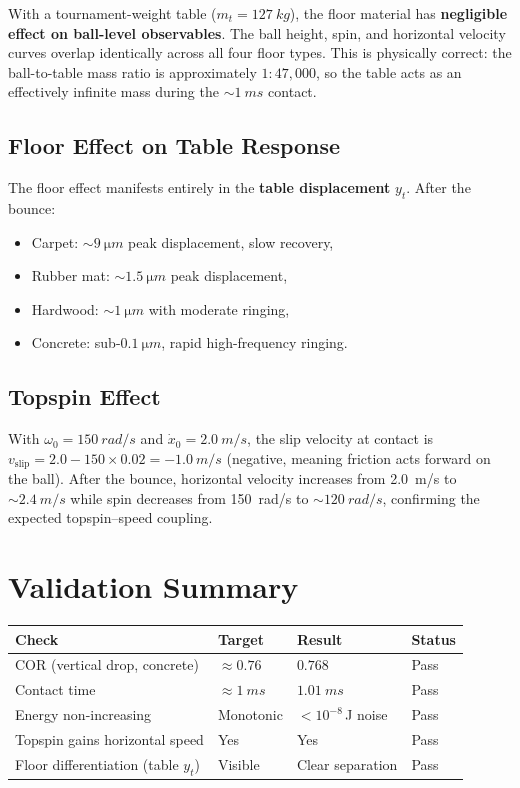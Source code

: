 \documentclass[11pt,a4paper]{article}
\begin{document}
With a tournament-weight table ($m_t = \SI{127}{kg}$), the floor material has
\textbf{negligible effect on ball-level observables}. The ball height, spin,
and horizontal velocity curves overlap identically across all four floor
types. This is physically correct: the ball-to-table mass ratio is
approximately $1{:}47{,}000$, so the table acts as an effectively infinite
mass during the ${\sim}\SI{1}{ms}$ contact.

\subsection{Floor Effect on Table Response}

The floor effect manifests entirely in the \textbf{table displacement}
$y_t$. After the bounce:
\begin{itemize}[nosep]
  \item Carpet: ${\sim}\SI{9}{\micro m}$ peak displacement, slow recovery,
  \item Rubber mat: ${\sim}\SI{1.5}{\micro m}$ peak displacement,
  \item Hardwood: ${\sim}\SI{1}{\micro m}$ with moderate ringing,
  \item Concrete: sub-$\SI{0.1}{\micro m}$, rapid high-frequency ringing.
\end{itemize}

\subsection{Topspin Effect}

With $\omega_0 = \SI{150}{rad/s}$ and $\dot{x}_0 = \SI{2.0}{m/s}$, the slip
velocity at contact is $v_{\text{slip}} = 2.0 - 150 \times 0.02 =
\SI{-1.0}{m/s}$ (negative, meaning friction acts forward on the ball).
After the bounce, horizontal velocity increases from \SI{2.0}{m/s} to
${\sim}\SI{2.4}{m/s}$ while spin decreases from \SI{150}{rad/s} to
${\sim}\SI{120}{rad/s}$, confirming the expected topspin--speed coupling.

\section{Validation Summary}

\begin{center}
\begin{tabular}{@{}llll@{}}
  \toprule
  Check & Target & Result & Status \\
  \midrule
  COR (vertical drop, concrete) & $\approx 0.76$ & $0.768$ & Pass \\
  Contact time & $\approx \SI{1}{ms}$ & $\SI{1.01}{ms}$ & Pass \\
  Energy non-increasing & Monotonic & $< 10^{-8}$\,J noise & Pass \\
  Topspin gains horizontal speed & Yes & Yes & Pass \\
  Floor differentiation (table $y_t$) & Visible & Clear separation & Pass \\
  \bottomrule
\end{tabular}
\end{center}
\end{document}
